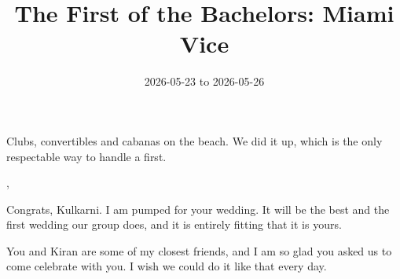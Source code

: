 
\title{The First of the Bachelors: Miami Vice}
\date{2026-05-23 to 2026-05-26}




Clubs, convertibles and cabanas on the beach. We did it up, which is the only
respectable way to handle a first.




\sep

Congrats, Kulkarni. I am pumped for your wedding. It will be the best and the
first wedding our group does, and it is entirely fitting that it is yours.

You and Kiran are some of my closest friends, and I am so glad you asked us to
come celebrate with you. I wish we could do it like that every day.


